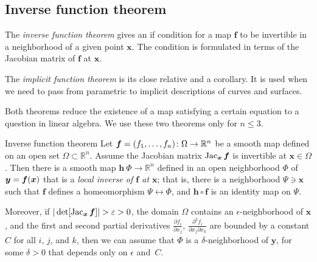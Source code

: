 \begin{multicols}{2}
{\subsection*{Inverse function theorem}

The \emph{inverse function theorem} gives an if condition for a map $\bm{f}$ to be invertible in a neighborhood of a given point $\bm{x}$.
The condition is formulated in terms of the Jacobian matrix of $\bm{f}$ at $\bm{x}$.

The \emph{implicit function theorem} is its close relative and a corollary.
It is used when we need to pass from parametric to implicit descriptions of curves and surfaces.

Both theorems reduce the existence of a map satisfying a certain equation to a question in linear algebra.
We use these two theorems only for $n\le 3$.

\begin{thm}{Inverse function theorem}\label{thm:inverse}
Let $\bm{f}\z=(f_1,\dots,f_n)\:\Omega\to\mathbb{R}^n$ be a smooth map
defined on an open set $\Omega\subset \mathbb{R}^n$.
Assume the Jacobian matrix
$\mathop{\rm Jac}\nolimits_{\bm{x}}\bm{f}$
is invertible at $\bm{x}\in \Omega$.
Then there is a smooth map $\bm{h}\:\Phi\to\mathbb{R}^n$ defined in an open neighborhood $\Phi$ of ${\bm{y}}\z=\bm{f}(\bm{x})$ that is a {}\emph{local inverse of $\bm{f}$ at $\bm{x}$};
that is, there is a neighborhood $\Psi\ni \bm{x}$ such that
$\bm{f}$ defines a homeomorphism $\Psi\leftrightarrow \Phi$, and
$\bm{h} \circ \bm{f}$ is an identity map on $\Psi$.

Moreover, if $|\det[\Jac_{\bm{x}}\bm{f}]|>\epsilon>0$, the domain $\Omega$ contains an $\epsilon$-neighborhood of $\bm{x}$, 
and the first and second partial derivatives $\tfrac{\partial f_i}{\partial x_j}$, $\tfrac{\partial^2 f_i}{\partial x_j\partial x_k}$ are bounded by a constant $C$ for all $i$, $j$, and $k$, then we can assume that $\Phi$ is a $\delta$-neighborhood of $\bm{y}$, for some $\delta>0$ that depends only on $\epsilon$ and~$C$. 
\end{thm}

}
\end{multicols}
